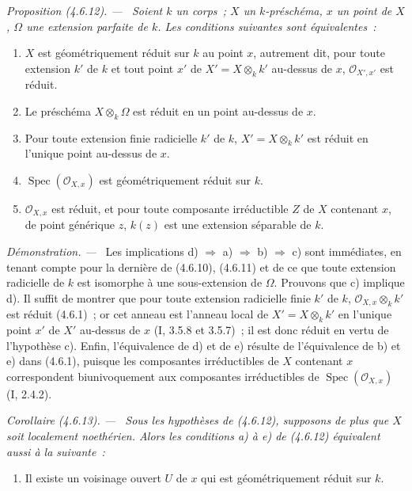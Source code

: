 \documentclass[10pt,oneside]{book}
\newenvironment{proposition}[1][]{%
  \par\medskip\noindent\itshape Proposition (#1). ---\ }{\par}
\newenvironment{corollary}[1][]{%
  \par\medskip\noindent\itshape Corollaire (#1). ---\ }{\par}
\newenvironment{proof}{%
  \par\medskip\noindent\textit{Démonstration. ---\ }}{\par}
\begin{document}
\begin{proposition}[4.6.12]
\label{IV.2.4.6.12-fr}
Soient $k$ un corps~; $X$ un $k$-préschéma, $x$ un point de $X$, $\Omega$ une
extension parfaite de $k$. Les conditions suivantes sont équivalentes~:
\begin{enumerate}
\item[a)] $X$ est géométriquement réduit sur $k$ au point $x$, autrement dit,
pour toute extension $k'$ de $k$ et tout point $x'$ de
$X'=X\otimes_k k'$ au-dessus de $x$, $\mathcal O_{X',x'}$ est réduit.
\item[b)] Le préschéma $X\otimes_k\Omega$ est réduit en un point au-dessus de
$x$.
\item[c)] Pour toute extension finie radicielle $k'$ de $k$,
$X'=X\otimes_k k'$ est réduit en l'unique point au-dessus de $x$.
\item[d)] $\operatorname{Spec}(\mathcal O_{X,x})$ est géométriquement réduit
sur $k$.
\item[e)] $\mathcal O_{X,x}$ est réduit, et pour toute composante irréductible
$Z$ de $X$ contenant $x$, de point générique $z$, $k(z)$ est une extension
séparable de $k$.
\end{enumerate}
\end{proposition}

\begin{proof}
Les implications d) $\Rightarrow$ a) $\Rightarrow$ b) $\Rightarrow$ c) sont
immédiates, en tenant compte pour la dernière de (4.6.10), (4.6.11) et de ce
que toute extension radicielle de $k$ est isomorphe à une sous-extension de
$\Omega$. Prouvons que c) implique d). Il suffit de montrer que pour toute
extension radicielle finie $k'$ de $k$, $\mathcal O_{X,x}\otimes_k k'$ est
réduit (4.6.1)~; or cet anneau est l'anneau local de $X'=X\otimes_k k'$ en
l'unique point $x'$ de $X'$ au-dessus de $x$ (I, 3.5.8 et 3.5.7)~; il est donc
réduit en vertu de l'hypothèse c). Enfin, l'équivalence de d) et de e)
résulte de l'équivalence de b) et e) dans (4.6.1), puisque les composantes
irréductibles de $X$ contenant $x$ correspondent biunivoquement aux composantes
irréductibles de $\operatorname{Spec}(\mathcal O_{X,x})$ (I, 2.4.2).
\end{proof}

\begin{corollary}[4.6.13]
\label{IV.2.4.6.13-fr}
Sous les hypothèses de (4.6.12), supposons de plus que $X$ soit localement
noethérien. Alors les conditions a) à e) de (4.6.12) équivalent aussi à la
suivante~:
\begin{enumerate}
\item[f)] Il existe un voisinage ouvert $U$ de $x$ qui est géométriquement
réduit sur $k$.
\end{enumerate}
\end{corollary}
\end{document}
